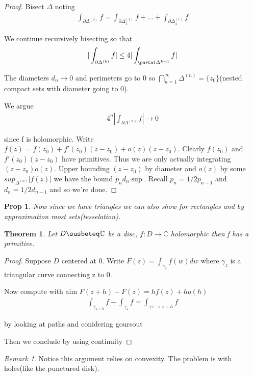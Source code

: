\documentclass[11pt]{article}
\newcommand{\C}{\mathbb{C}}
\newtheorem{theorem}{Theorem}
\newtheorem{prop}{Prop}
\theoremstyle{remark}
\newtheorem{remark}{Remark}
\begin{document}
\begin{proof}
	Bisect $\Delta$ noting
	\begin{align*}
		\int_{\partial \Delta^{(0)}} f = \int_{\partial \Delta^{(1)}_1} f + ... + \int_{\partial \Delta^{(1)}_4} f
	\end{align*}

	We continue recursively bisecting so that
	\begin{align*}
		|\int_{\partial \Delta^{(k)}} f| \leq 4 |\int_{\partal \Delta^{k+1}} f|
	\end{align*}

	The diameters $d_n \to 0$ and perimeters go to 0 so $\bigcap_{n=1}^{\infty} \Delta^{(n)} = \{z_0\}$(nested compact sets with diameter going to 0).

	We argue
	\begin{align*}
		4^n |\int_{\partial \Delta^{(n)}} f| \to 0
	\end{align*}

	since f is holomorphic. Write $f(z) = f(z_0) + f'(z_0)(z-z_0) + o(z)(z-z_0)$. Clearly $f(z_0)$ and $f'(z_0)(z-z_0)$ have primitives. Thus we are only actually integrating $(z-z_0)o(z)$. Upper bounding $(z-z_0)$ by diameter and $o(z)$ by some $sup_{\Delta^{(n)}} |f(z)|$ we have the bound $p_n d_n \sup$. Recall $p_n = 1/2p_{n-1}$ and $d_n = 1/2 d_{n-1}$ and so we're done.
\end{proof}

\begin{prop}
	Now since we have triangles we can also show for rectangles and by approximation most sets(tesselation). 
\end{prop}

\begin{theorem}
	Let $D \susbeteq \C$ be a disc, $f: D \to \C$ holomorphic then f has a primitive. 
\end{theorem}

\begin{proof}
	Suppose $D$ centered at 0. Write $F(z) = \int_{\gamma_z} f(w)dw$ where $\gamma_z$ is a triangular curve connecting z to 0. 

	Now compute with aim $F(z+h) - F(z) = hf(z)+ho(h) $
	\begin{align*}
		\int_{\gamma_{z+h}} f - \int_{\gamma_z}f = \int_{\gamma{z \to z+h}} f 
	\end{align*}

	by looking at paths and conidering goursout

	Then we conclude by using continuity 
\end{proof}

\begin{remark}
	Notice this argument relies on convexity. The problem is with holes(like the punctured disk).
\end{remark}
\end{document}
